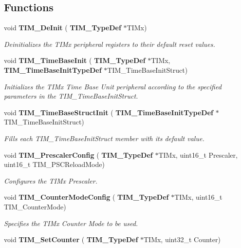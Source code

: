 \subsection*{Functions}
\begin{DoxyCompactItemize}
\item 
void \textbf{ T\+I\+M\+\_\+\+De\+Init} (\textbf{ T\+I\+M\+\_\+\+Type\+Def} $\ast$T\+I\+Mx)
\begin{DoxyCompactList}\small\item\em Deinitializes the T\+I\+Mx peripheral registers to their default reset values. \end{DoxyCompactList}\item 
void \textbf{ T\+I\+M\+\_\+\+Time\+Base\+Init} (\textbf{ T\+I\+M\+\_\+\+Type\+Def} $\ast$T\+I\+Mx, \textbf{ T\+I\+M\+\_\+\+Time\+Base\+Init\+Type\+Def} $\ast$T\+I\+M\+\_\+\+Time\+Base\+Init\+Struct)
\begin{DoxyCompactList}\small\item\em Initializes the T\+I\+Mx Time Base Unit peripheral according to the specified parameters in the T\+I\+M\+\_\+\+Time\+Base\+Init\+Struct. \end{DoxyCompactList}\item 
void \textbf{ T\+I\+M\+\_\+\+Time\+Base\+Struct\+Init} (\textbf{ T\+I\+M\+\_\+\+Time\+Base\+Init\+Type\+Def} $\ast$T\+I\+M\+\_\+\+Time\+Base\+Init\+Struct)
\begin{DoxyCompactList}\small\item\em Fills each T\+I\+M\+\_\+\+Time\+Base\+Init\+Struct member with its default value. \end{DoxyCompactList}\item 
void \textbf{ T\+I\+M\+\_\+\+Prescaler\+Config} (\textbf{ T\+I\+M\+\_\+\+Type\+Def} $\ast$T\+I\+Mx, uint16\+\_\+t Prescaler, uint16\+\_\+t T\+I\+M\+\_\+\+P\+S\+C\+Reload\+Mode)
\begin{DoxyCompactList}\small\item\em Configures the T\+I\+Mx Prescaler. \end{DoxyCompactList}\item 
void \textbf{ T\+I\+M\+\_\+\+Counter\+Mode\+Config} (\textbf{ T\+I\+M\+\_\+\+Type\+Def} $\ast$T\+I\+Mx, uint16\+\_\+t T\+I\+M\+\_\+\+Counter\+Mode)
\begin{DoxyCompactList}\small\item\em Specifies the T\+I\+Mx Counter Mode to be used. \end{DoxyCompactList}\item 
void \textbf{ T\+I\+M\+\_\+\+Set\+Counter} (\textbf{ T\+I\+M\+\_\+\+Type\+Def} $\ast$T\+I\+Mx, uint32\+\_\+t Counter)

\end{DoxyCompactItemize}
